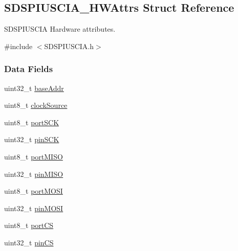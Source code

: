 \subsection{S\+D\+S\+P\+I\+U\+S\+C\+I\+A\+\_\+\+H\+W\+Attrs Struct Reference}
\label{struct_s_d_s_p_i_u_s_c_i_a___h_w_attrs}


S\+D\+S\+P\+I\+U\+S\+C\+I\+A Hardware attributes.  




{\ttfamily \#include $<$S\+D\+S\+P\+I\+U\+S\+C\+I\+A.\+h$>$}

\subsubsection*{Data Fields}
\begin{DoxyCompactItemize}
\item 
uint32\+\_\+t \hyperlink{struct_s_d_s_p_i_u_s_c_i_a___h_w_attrs_a87f31bfb5a18ef1ee74159bea6468b0c}{base\+Addr}
\item 
uint8\+\_\+t \hyperlink{struct_s_d_s_p_i_u_s_c_i_a___h_w_attrs_add9927f11133e234d9f2b7966a277d9a}{clock\+Source}
\item 
uint8\+\_\+t \hyperlink{struct_s_d_s_p_i_u_s_c_i_a___h_w_attrs_a545e93277d0f2f9baa739dd4aa2f522c}{port\+S\+C\+K}
\item 
uint32\+\_\+t \hyperlink{struct_s_d_s_p_i_u_s_c_i_a___h_w_attrs_ade1ffabe6dd56a16961de4cd932c42ed}{pin\+S\+C\+K}
\item 
uint8\+\_\+t \hyperlink{struct_s_d_s_p_i_u_s_c_i_a___h_w_attrs_a03bbc916522b71d1a3c0576524132af7}{port\+M\+I\+S\+O}
\item 
uint32\+\_\+t \hyperlink{struct_s_d_s_p_i_u_s_c_i_a___h_w_attrs_aa29d7994ce14deeefe02f8e23ea2cdad}{pin\+M\+I\+S\+O}
\item 
uint8\+\_\+t \hyperlink{struct_s_d_s_p_i_u_s_c_i_a___h_w_attrs_aee9dcb6e9df720f538cdbe31ecfb4282}{port\+M\+O\+S\+I}
\item 
uint32\+\_\+t \hyperlink{struct_s_d_s_p_i_u_s_c_i_a___h_w_attrs_a533960d70e8a95683825c5569d6044cd}{pin\+M\+O\+S\+I}
\item 
uint8\+\_\+t \hyperlink{struct_s_d_s_p_i_u_s_c_i_a___h_w_attrs_aa10da6b5705fa5bdb6087a7f44374ea1}{port\+C\+S}
\item 
uint32\+\_\+t \hyperlink{struct_s_d_s_p_i_u_s_c_i_a___h_w_attrs_a5d7132ccc67a85fa26e3c1af856410c4}{pin\+C\+S}
\end{DoxyCompactItemize}


